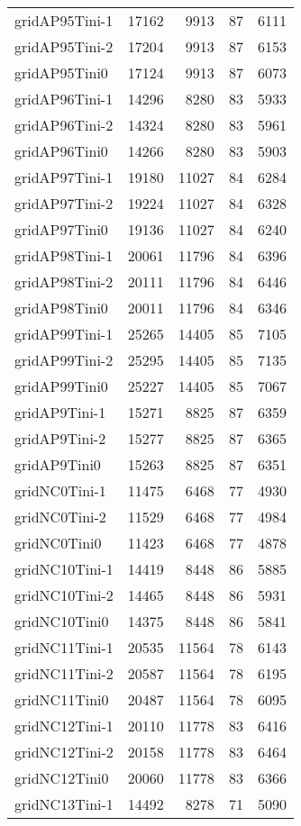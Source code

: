\begin{longtable}{lrrrr}
gridAP95Tini-1 & 17162 & 9913 & 87 & 6111 \\
gridAP95Tini-2 & 17204 & 9913 & 87 & 6153 \\
gridAP95Tini0 & 17124 & 9913 & 87 & 6073 \\
gridAP96Tini-1 & 14296 & 8280 & 83 & 5933 \\
gridAP96Tini-2 & 14324 & 8280 & 83 & 5961 \\
gridAP96Tini0 & 14266 & 8280 & 83 & 5903 \\
gridAP97Tini-1 & 19180 & 11027 & 84 & 6284 \\
gridAP97Tini-2 & 19224 & 11027 & 84 & 6328 \\
gridAP97Tini0 & 19136 & 11027 & 84 & 6240 \\
gridAP98Tini-1 & 20061 & 11796 & 84 & 6396 \\
gridAP98Tini-2 & 20111 & 11796 & 84 & 6446 \\
gridAP98Tini0 & 20011 & 11796 & 84 & 6346 \\
gridAP99Tini-1 & 25265 & 14405 & 85 & 7105 \\
gridAP99Tini-2 & 25295 & 14405 & 85 & 7135 \\
gridAP99Tini0 & 25227 & 14405 & 85 & 7067 \\
gridAP9Tini-1 & 15271 & 8825 & 87 & 6359 \\
gridAP9Tini-2 & 15277 & 8825 & 87 & 6365 \\
gridAP9Tini0 & 15263 & 8825 & 87 & 6351 \\
gridNC0Tini-1 & 11475 & 6468 & 77 & 4930 \\
gridNC0Tini-2 & 11529 & 6468 & 77 & 4984 \\
gridNC0Tini0 & 11423 & 6468 & 77 & 4878 \\
gridNC10Tini-1 & 14419 & 8448 & 86 & 5885 \\
gridNC10Tini-2 & 14465 & 8448 & 86 & 5931 \\
gridNC10Tini0 & 14375 & 8448 & 86 & 5841 \\
gridNC11Tini-1 & 20535 & 11564 & 78 & 6143 \\
gridNC11Tini-2 & 20587 & 11564 & 78 & 6195 \\
gridNC11Tini0 & 20487 & 11564 & 78 & 6095 \\
gridNC12Tini-1 & 20110 & 11778 & 83 & 6416 \\
gridNC12Tini-2 & 20158 & 11778 & 83 & 6464 \\
gridNC12Tini0 & 20060 & 11778 & 83 & 6366 \\
gridNC13Tini-1 & 14492 & 8278 & 71 & 5090 \\

\end{longtable}
